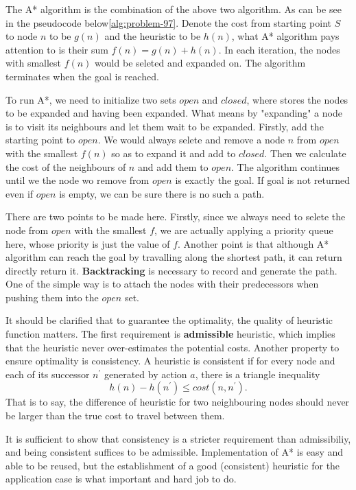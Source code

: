 \documentclass[catalog.tex]{subfiles}
\begin{document}
The A* algorithm is the combination of the above two algorithm. As can be see in the pseudocode below\ref{alg:problem-97}. Denote the cost from starting point $S$ to node $n$ to be $g(n)$ and the heuristic to be $h(n)$, what A* algorithm pays attention to is their sum $f(n)=g(n)+h(n)$. In each iteration, the nodes with smallest $f(n)$ would be seleted and expanded on. The algorithm terminates when the goal is reached.

To run A*, we need to initialize two sets $open$ and $closed$, where stores the nodes to be expanded and having been expanded. What means by "expanding" a node is to visit its neighbours and let them wait to be expanded. Firstly, add the starting point to $open$. We would always selete and remove a node $n$ from $open$ with the smallest $f(n)$ so as to expand it and add to $closed$. Then we calculate the cost of the neighbours of $n$ and add them to $open$. The algorithm continues until we the node wo remove from $open$ is exactly the goal. If goal is not returned even if $open$ is empty, we can be sure there is no such a path. 

There are two points to be made here. Firstly, since we always need to selete the node from $open$ with the smallest $f$, we are actually applying a priority queue here, whose priority is just the value of $f$. Another point is that although A* algorithm can reach the goal by travalling along the shortest path, it can return directly return it. \textbf{Backtracking} is necessary to record and generate the path. One of the simple way is to attach the nodes with their predecessors when pushing them into the $open$ set. 

It should be clarified that to guarantee the optimality, the quality of heuristic function matters. The first requirement is \textbf{admissible} heuristic, which implies that the heuristic never over-estimates the potential costs. Another property to ensure optimality is consistency. A heuristic is consistent if for every node and each of its successor $n^\prime$ generated by action $a$, there is a triangle inequality
$$
h(n) - h(n^\prime) \leq cost(n, n^\prime).
$$
That is to say, the difference of heuristic for two neighbouring nodes should never be larger than the true cost to travel between them. 

It is sufficient to show that consistency is a stricter requirement than admissibiliy, and being consistent suffices to be admissible. Implementation of A* is easy and able to be reused, but the establishment of a good (consistent) heuristic for the application case is what important and hard job to do.
\end{document}
